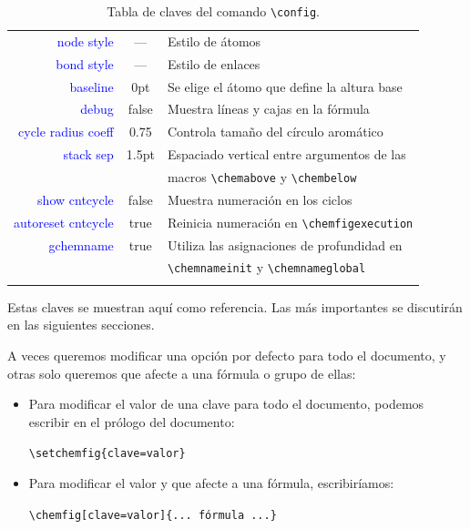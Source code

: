 \begin{center}
\begin{longtable}{rcl}
  \textcolor{blue}{node style}
  & ---
  & Estilo de átomos\\
  \textcolor{blue}{bond style}
  & ---
  & Estilo de enlaces\\
  \textcolor{blue}{baseline}
  & 0pt
  & Se elige el átomo que define la altura base\\
  \textcolor{blue}{debug}
  & false
  & Muestra líneas y cajas en la fórmula\\
  \textcolor{blue}{cycle radius coeff}
  & 0.75
  & Controla tamaño del círculo aromático\\
  \textcolor{blue}{stack sep}
  & 1.5pt
  & Espaciado vertical entre argumentos de las\\&& macros \texttt{\textbackslash chemabove} y \texttt{\textbackslash chembelow}\\
  \textcolor{blue}{show cntcycle}
  & false
  & Muestra numeración en los ciclos\\
  \textcolor{blue}{autoreset cntcycle}
  & true
  & Reinicia numeración en \texttt{\textbackslash chemfigexecution}\\
  \textcolor{blue}{gchemname}
  & true
  & Utiliza las asignaciones de profundidad en \\&& \texttt{\textbackslash chemnameinit} y \texttt{\textbackslash chemnameglobal}\\
    \hline
    \caption{Tabla de claves del comando \texttt{\backslash config}.}
  \end{longtable}
\end{center}

Estas claves se muestran aquí como referencia. Las más importantes se discutirán en las
siguientes secciones.

A veces queremos modificar una opción por defecto para todo el documento, y otras
solo queremos que afecte a una fórmula o grupo de ellas:
\begin{itemize}
\item Para modificar el valor de una clave para todo el documento, podemos
  escribir en el prólogo del documento:
  \begin{center}
    \texttt{\textbackslash setchemfig\{clave=valor\}}
  \end{center}
  \item Para modificar el valor y que afecte a una fórmula, escribiríamos:
    \begin{center}
      \texttt{\textbackslash chemfig[clave=valor]\{... fórmula ...\}}
    \end{center}
\end{itemize}

